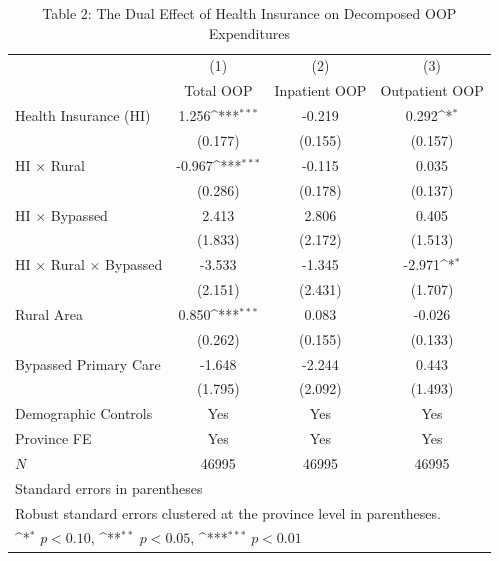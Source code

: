 \begin{table}[htbp]\centering
\def\sym#1{\ifmmode^{#1}\else\(^{#1}\)\fi}
\caption{Table 2: The Dual Effect of Health Insurance on Decomposed OOP Expenditures}
\begin{tabular}{l*{3}{c}}
\hline\hline
            &\multicolumn{1}{c}{(1)}&\multicolumn{1}{c}{(2)}&\multicolumn{1}{c}{(3)}\\
            &\multicolumn{1}{c}{Total OOP}&\multicolumn{1}{c}{Inpatient OOP}&\multicolumn{1}{c}{Outpatient OOP}\\
\hline
Health Insurance (HI)&       1.256\sym{***}&      -0.219         &       0.292\sym{*}  \\
            &     (0.177)         &     (0.155)         &     (0.157)         \\
[1em]
HI $\times$ Rural&      -0.967\sym{***}&      -0.115         &       0.035         \\
            &     (0.286)         &     (0.178)         &     (0.137)         \\
[1em]
HI $\times$ Bypassed&       2.413         &       2.806         &       0.405         \\
            &     (1.833)         &     (2.172)         &     (1.513)         \\
[1em]
HI $\times$ Rural $\times$ Bypassed&      -3.533         &      -1.345         &      -2.971\sym{*}  \\
            &     (2.151)         &     (2.431)         &     (1.707)         \\
[1em]
Rural Area  &       0.850\sym{***}&       0.083         &      -0.026         \\
            &     (0.262)         &     (0.155)         &     (0.133)         \\
[1em]
Bypassed Primary Care&      -1.648         &      -2.244         &       0.443         \\
            &     (1.795)         &     (2.092)         &     (1.493)         \\
[1em]
Demographic Controls &         Yes         &         Yes         &         Yes         \\
[1em]
Province FE &         Yes         &         Yes         &         Yes         \\
\hline
\(N\)       &       46995         &       46995         &       46995         \\
\hline\hline
\multicolumn{4}{l}{\footnotesize Standard errors in parentheses}\\
\multicolumn{4}{l}{\footnotesize Robust standard errors clustered at the province level in parentheses.}\\
\multicolumn{4}{l}{\footnotesize \sym{*} \(p<0.10\), \sym{**} \(p<0.05\), \sym{***} \(p<0.01\)}\\
\end{tabular}
\end{table}
